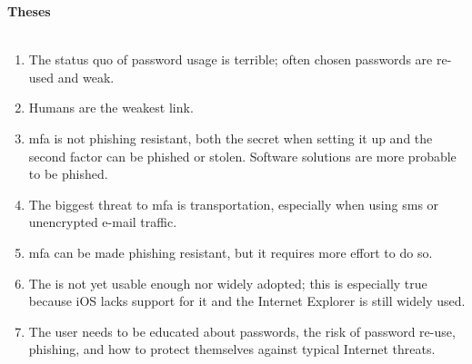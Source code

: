 \thispagestyle{noheader}

{}

\begin{large}
	\textbf{Theses} \\ \\
\end{large}


\begin{enumerate}
	\setlength{\itemsep}{1cm}
	\item The status quo of password usage is terrible; often chosen passwords are re-used and weak.
	\item Humans are the weakest link.
	\item \Glsdesc{mfa} is not phishing resistant, both the secret when setting it up and the second factor can be phished or stolen. Software solutions are more probable to be phished.
	\item The biggest threat to \glsdesc{mfa} is transportation, especially when using \gls{sms} or unencrypted e-mail traffic.
	\item \Glsdesc{mfa} can be made phishing resistant, but it requires more effort to do so.
	\item The \wa{} is not yet usable enough nor widely adopted; this is especially true because iOS lacks support for it and the Internet Explorer is still widely used.
	\item The user needs to be educated about passwords, the risk of password re-use, phishing, and how to protect themselves against typical Internet threats.
\end{enumerate}
